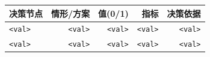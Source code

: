 \begin{tabular}{lrrrr}
\toprule
\textbf{决策节点} & \textbf{情形/方案} & \textbf{值(0/1)} & \textbf{指标} & \textbf{决策依据} \\\midrule
\texttt{<val>} & \texttt{<val>} & \texttt{<val>} & \texttt{<val>} & \texttt{<val>} \\
\texttt{<val>} & \texttt{<val>} & \texttt{<val>} & \texttt{<val>} & \texttt{<val>} \\\bottomrule
\end{tabular}
